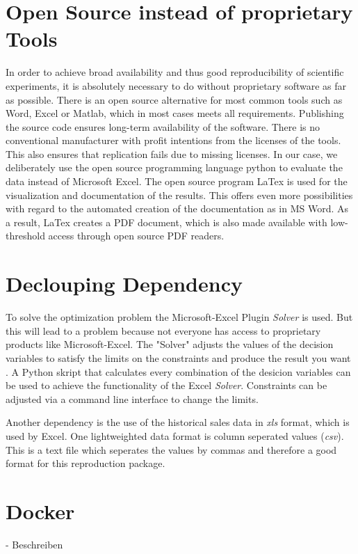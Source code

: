 \documentclass{article}
\begin{document}
\begin{multicols}{2}
\section{Open Source instead of proprietary Tools}
In order to achieve broad availability and thus good reproducibility of scientific experiments, it is absolutely necessary to do without proprietary software as far as possible. There is an open source alternative for most common tools such as Word, Excel or Matlab, which in most cases meets all requirements. Publishing the source code ensures long-term availability of the software. There is no conventional manufacturer with profit intentions from the licenses of the tools. This also ensures that replication fails due to missing licenses.
In our case, we deliberately use the open source programming language python to evaluate the data instead of Microsoft Excel. The open source program LaTex is used for the visualization and documentation of the results. This offers even more possibilities with regard to the automated creation of the documentation as in MS Word. As a result, LaTex creates a PDF document, which is also made available with low-threshold access through open source PDF readers.


\section{Declouping Dependency}
To solve the optimization problem the Microsoft-Excel Plugin \textit{Solver} is used. But this will lead to a problem because not everyone has access to proprietary products like Microsoft-Excel. The "Solver" adjusts the values of the decision variables to satisfy the limits on the constraints and produce the result you want \cite{microsoft}. A Python skript that calculates every combination of the desicion variables can be used to achieve the functionality of the Excel \textit{Solver}. Constraints can be adjusted via a command line interface to change the limits. 

Another dependency is the use of the historical sales data in \textit{xls} format, which is used by Excel. One lightweighted data format is column seperated values (\textit{csv}). This is a text file which seperates the values by commas and therefore a good format for this reproduction package. 

\section{Docker}
- Beschreiben


\end{multicols}
\end{document}
